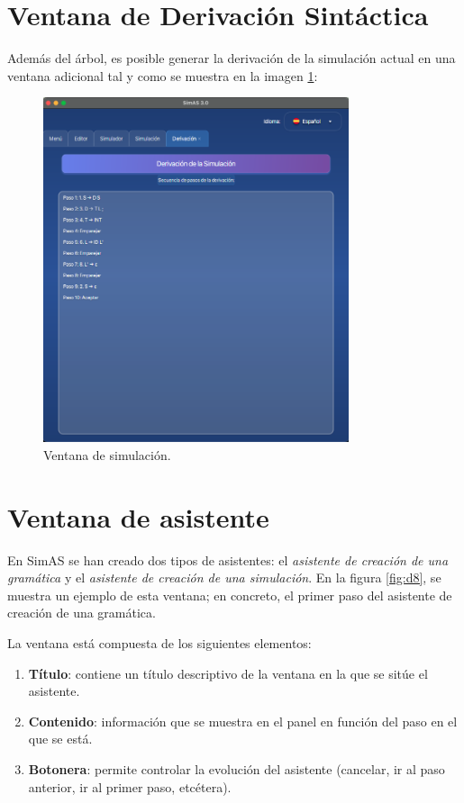  \section{Ventana de Derivación Sintáctica}

Además del árbol, es posible generar la derivación de la simulación actual en una ventana adicional tal y como se muestra en la imagen \ref{fig:da24}:

\begin{figure}[htp]
\centering
	\includegraphics[width=0.8\textwidth]{figuras2/simulador/simulacion_derivacion.png}
	\caption{Ventana de simulación.}
	\label{fig:da24}
\end{figure}

\section{Ventana de asistente}

En SimAS se han creado dos tipos de asistentes: el \textit{asistente de creación de una gramática} y el \textit{asistente de creación de una simulación}. En la figura \ref{fig:d8}, se muestra un ejemplo de esta ventana; en concreto, el primer paso del asistente de creación de una gramática.

La ventana está compuesta de los siguientes elementos:
\begin{enumerate}
 \item \textbf{Título}: contiene un título descriptivo de la ventana en la que se sitúe el asistente.
 \item \textbf{Contenido}: información que se muestra en el panel en función del paso en el que se está.
 \item \textbf{Botonera}: permite controlar la evolución del asistente (cancelar, ir al paso anterior, ir al primer paso, etcétera).
\end{enumerate}

